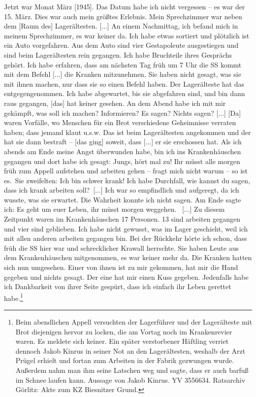 \label{widerstand_kinrus}
\begin{leftbar}
Jetzt war Monat März [1945]. Das Datum habe ich nicht vergessen -- es war der 15. März. Dies war auch mein größtes Erlebnis. \newline
Mein Sprechzimmer war neben dem [Raum des] Lagerältesten. [...] An einem Nachmittag, ich befand mich in meinem Sprechzimmer, es war keiner da. Ich habe etwas sortiert und plötzlich ist ein Auto vorgefahren. Aus dem Auto sind vier Gestapoleute ausgestiegen und sind beim Lager\-ältesten rein gegangen. Ich habe Bruchteile ihres Gesprächs gehört. Ich habe erfahren, dass am nächsten Tag früh um 7 Uhr die SS kommt mit dem Befehl [...] die Kranken mitzunehmen. Sie haben nicht gesagt, was sie mit ihnen machen, nur dass sie so einen Befehl haben. Der Lager\-älteste hat das entgegengenommen. Ich habe abgewartet, bis sie abgefahren sind, und bin dann raus gegangen, [das] hat keiner gesehen. An dem Abend habe ich mit mir gekämpft, was soll ich machen? Informieren? Es sagen? Nichts sagen? [...] [Da] waren Vorfälle, wo Menschen für ein Brot verschiedene Geheimnisse verraten haben; dass jemand klaut u.s.w. Das ist beim Lager\-ältesten angekommen und der hat sie dann bestraft -- [das ging] soweit, dass [...] er sie erschossen hat. Als ich abends am Ende meine Angst überwunden habe, bin ich ins Krankenhäuschen gegangen und dort habe ich gesagt: \glqq Jungs, hört mal zu! Ihr müsst alle morgen früh zum Appell aufstehen und arbeiten gehen -- fragt mich nicht warum -- so ist es.\grqq~Sie zweifelten: \glqq Ich bin schwer krank! Ich habe Durchfall, wie kannst du sagen, dass ich krank arbeiten soll?\grqq~[...] Ich war so empfindlich und aufgeregt, da ich wusste, was sie erwartet. Die Wahrheit konnte ich nicht sagen. Am Ende sagte ich: \glqq Es geht um euer Leben, ihr müsst morgen weggehen.\grqq~
[...] Zu diesem Zeitpunkt waren im Krankenhäuschen 17 Personen. 13 sind arbeiten gegangen und vier sind geblieben. Ich habe nicht gewusst, was im Lager geschieht, weil ich mit allen anderen arbeiten gegangen bin. Bei der Rückkehr hörte ich schon, dass früh die SS hier war und schrecklicher Krawall herrschte. Sie haben Leute aus dem Krankenhäuschen mitgenommen, es war keiner mehr da. Die Kranken hatten sich nun umgesehen. Einer von ihnen ist zu mir gekommen, hat mir die Hand gegeben und nichts gesagt. Der eine hat mir einen Kuss gegeben. Jedenfalls habe ich Dankbarkeit von ihrer Seite gespürt, dass ich einfach ihr Leben gerettet habe.\footnote{Beim abendlichen Appell versuchten der Lager\-führer und der Lager\-älteste mit Brot diejenigen hervor zu locken, die am Vortag noch im Krankenrevier waren. Es meldete sich keiner. Ein später verstorbener Häftling verriet dennoch Jakob Kinrus in seiner Not an den Lager\-ältesten, weshalb der Arzt Prügel erhielt und fortan zum Arbeiten in der Fabrik gezwungen wurde. Außerdem nahm man ihm seine Latschen weg und sagte, dass er auch barfuß im Schnee laufen kann. Aussage von Jakob Kinrus. YV 3556634. Ratsarchiv Görlitz: Akte zum KZ Biesnitzer Grund.}
\end{leftbar}

